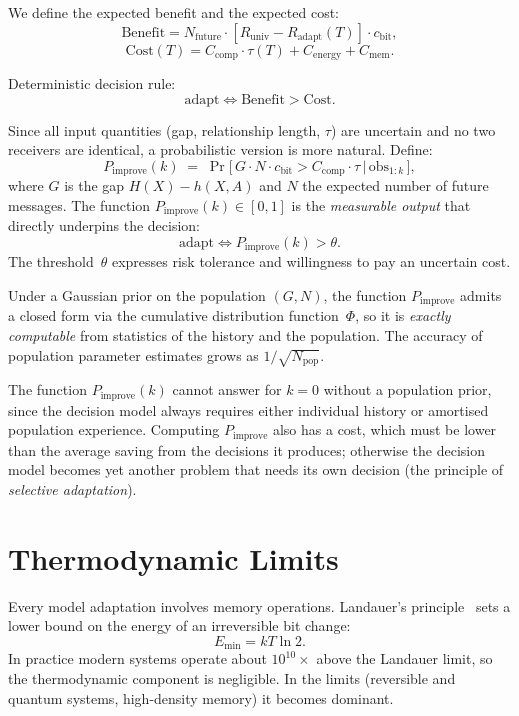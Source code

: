 \documentclass[11pt,a4paper]{article}
\begin{document}
We define the expected benefit and the expected cost:
\[
    \text{Benefit} = N_{\text{future}} \cdot [R_{\text{univ}} - R_{\text{adapt}}(T)] \cdot c_{\text{bit}},
\]
\[
    \text{Cost}(T) = C_{\text{comp}} \cdot \tau(T) + C_{\text{energy}} + C_{\text{mem}}.
\]

Deterministic decision rule:
\[
    \text{adapt} \iff \text{Benefit} > \text{Cost}.
\]

Since all input quantities (gap, relationship length, $\tau$) are
uncertain and no two receivers are identical, a probabilistic
version is more natural. Define:
\begin{equation}
    P_{\text{improve}}(k)
    \;=\; \Pr\!\big[\,G \cdot N \cdot c_{\text{bit}} > C_{\text{comp}} \cdot \tau
    \,\big|\, \text{obs}_{1:k}\,\big],
    \label{eq:pimprove}
\end{equation}
where $G$ is the gap $H(X) - h(X,A)$ and $N$ the expected number of
future messages. The function $P_{\text{improve}}(k) \in [0,1]$ is
the \emph{measurable output} that directly underpins the decision:
\[
    \text{adapt} \iff P_{\text{improve}}(k) > \theta.
\]
The threshold~$\theta$ expresses risk tolerance and willingness to
pay an uncertain cost.

Under a Gaussian prior on the population $(G, N)$, the function
$P_{\text{improve}}$ admits a closed form via the cumulative
distribution function~$\Phi$, so it is \emph{exactly computable} from
statistics of the history and the population. The accuracy of
population parameter estimates grows as $1/\sqrt{N_{\text{pop}}}$.

The function $P_{\text{improve}}(k)$ cannot answer for $k=0$ without
a population prior, since the decision model always requires either
individual history or amortised population experience. Computing
$P_{\text{improve}}$ also has a cost, which must be lower than the
average saving from the decisions it produces; otherwise the
decision model becomes yet another problem that needs its own
decision (the principle of \emph{selective adaptation}).

\section{Thermodynamic Limits}

Every model adaptation involves memory operations. Landauer's
principle~\cite{landauer1961} sets a lower bound on the energy of an
irreversible bit change:
\[
    E_{\min} = kT \ln 2.
\]
In practice modern systems operate about $10^{10}\times$ above the
Landauer limit, so the thermodynamic component is negligible. In the
limits (reversible and quantum systems, high-density memory) it
becomes dominant.
\end{document}
